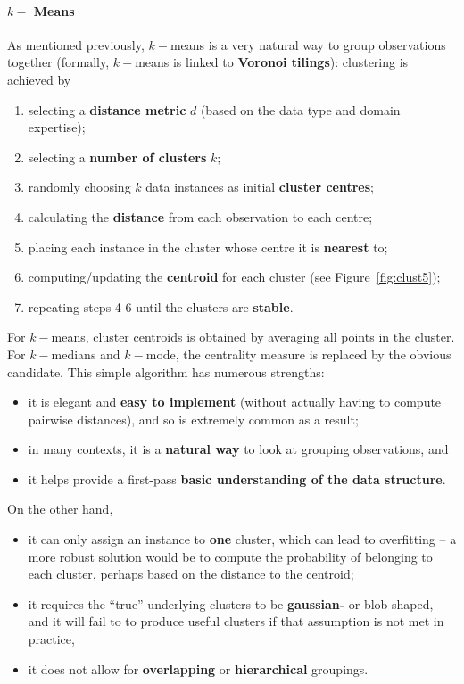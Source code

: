 \paragraph{$k-$ Means} As mentioned previously, $k-$means is a very natural way to group observations together (formally, $k-$means is linked to \textbf{Voronoi tilings}): clustering is achieved by 
\begin{enumerate}[noitemsep]
\item selecting a \textbf{distance metric} $d$ (based on the data type and domain expertise);
\item selecting a \textbf{number of clusters} $k$;
\item randomly choosing $k$ data instances as initial \textbf{cluster centres};
\item calculating the \textbf{distance} from each observation to each centre;
\item placing each instance in the cluster whose centre it is \textbf{nearest} to;
\item computing/updating the \textbf{centroid} for each cluster (see Figure~\ref{fig:clust5});
\item repeating steps 4-6 until the clusters are \textbf{stable}.
\end{enumerate}
For $k-$means, cluster centroids is obtained by averaging all points in the cluster. For $k-$medians and $k-$mode, the centrality measure is replaced by the obvious candidate. \newl 
This simple algorithm has numerous strengths: 
\begin{itemize}[noitemsep]
\item it is elegant and \textbf{easy to implement} (without actually having to compute pairwise distances), and so is extremely common as a result;
\item in many contexts, it is a \textbf{natural way} to look at grouping observations, and 
\item it helps provide a first-pass \textbf{basic understanding of the data structure}. 
\end{itemize}
On the other hand,
\begin{itemize}[noitemsep]
\item it can only assign an instance to \textbf{one} cluster, which can lead to overfitting -- a more robust solution would be to compute the probability of belonging to each cluster, perhaps based on the distance to the centroid; 
\item it requires the ``true'' underlying clusters to be \textbf{gaussian-} or blob-shaped, and it will fail to to produce useful clusters if that assumption is not met in practice, 
\item it does not allow for \textbf{overlapping} or \textbf{hierarchical} groupings. 
\end{itemize}
